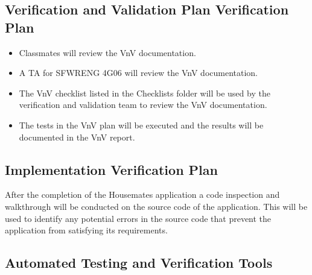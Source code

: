 \documentclass[12pt, titlepage]{article}
\begin{document}



\subsection{Verification and Validation Plan Verification Plan}

\begin{itemize}
    \item Classmates will review the VnV documentation.
    \item A TA for SFWRENG 4G06 will review the VnV documentation.
    \item The VnV checklist listed in the Checklists folder will be used by the verification and validation team to review the VnV documentation.
    \item The tests in the VnV plan will be executed and the results will be documented in the VnV report.
\end{itemize}






\subsection{Implementation Verification Plan}

After the completion of the Housemates application a code inspection and walkthrough will be conducted on the source code of the application. This will be used to identify any potential errors in the source code that prevent the application from satisfying its requirements.



\subsection{Automated Testing and Verification Tools}
\end{document}
